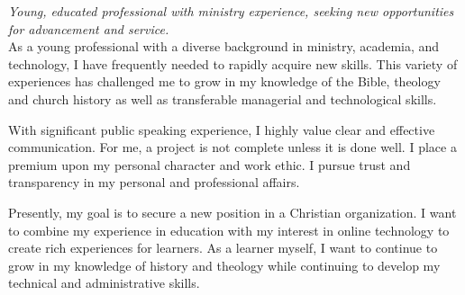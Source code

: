 
\vspace{-1.3em} %

\begin{multicols}{2}  %
\noindent \textit{Young, educated professional with ministry experience, seeking new opportunities for advancement and service.}\\

As a young professional with a diverse background in ministry, academia, and technology, I have frequently needed to rapidly acquire new skills. This variety of experiences has challenged me to grow in my knowledge of the Bible, theology and church history as well as transferable managerial and technological skills.

With significant public speaking experience, I highly value clear and effective communication. For me, a project is not complete unless it is done well. I place a premium upon my personal character and work ethic. I pursue trust and transparency in my personal and professional affairs.

Presently, my goal is to secure a new position in a Christian organization. I want to combine my experience in education with my interest in online technology to create rich experiences for learners. As a learner myself, I want to continue to grow in my knowledge of history and theology while continuing to develop my technical and administrative skills.

\end{multicols}

